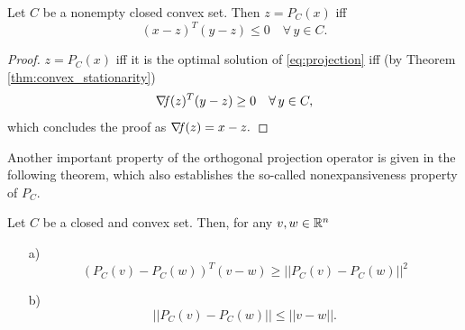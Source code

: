 \documentclass[10pt,a4paper]{article}
\begin{document}
\begin{theorem}\label{thm:second_projection}
	Let $C$ be a nonempty closed convex set. Then $z=P_C(x)$ iff 
	\begin{equation}\label{eq:second_projection}
		(x-z)^T(y-z) \leq 0\quad \forall \,y\in C.
	\end{equation}
\end{theorem}
\begin{proof}
	$z=P_C(x)$ iff it is the optimal solution of \eqref{eq:projection} iff (by Theorem \ref{thm:convex_stationarity})
	\begin{equation*}
		\operatorname*{\mathit{\nabla \!f}}(z)^T(y-z)\geq 0 \quad \forall\,y\in C,
	\end{equation*}
which concludes the proof as $\operatorname*{\mathit{\nabla \!f}}(z) = x-z.$
\end{proof}
Another important property of the orthogonal projection operator is given in the
following theorem, which also establishes the so-called nonexpansiveness property of $P_C$.
\begin{theorem}
	Let $C$ be a closed and convex set. Then, for any $v,w\in \mathbb{R}^n$
	\begin{itemize}
		\item[a)] 
		\begin{equation}\label{eq:nonexpansiveness_1}
			(P_C(v)-P_C(w))^T(v-w)\geq ||P_C(v)-P_C(w)||^2
		\end{equation}
		\item[b)]
		\begin{equation}\label{eq:nonexpansiveness_2}
			 ||P_C(v)-P_C(w)||\leq ||v-w||.
		\end{equation}
	\end{itemize}
\end{theorem}
\end{document}
